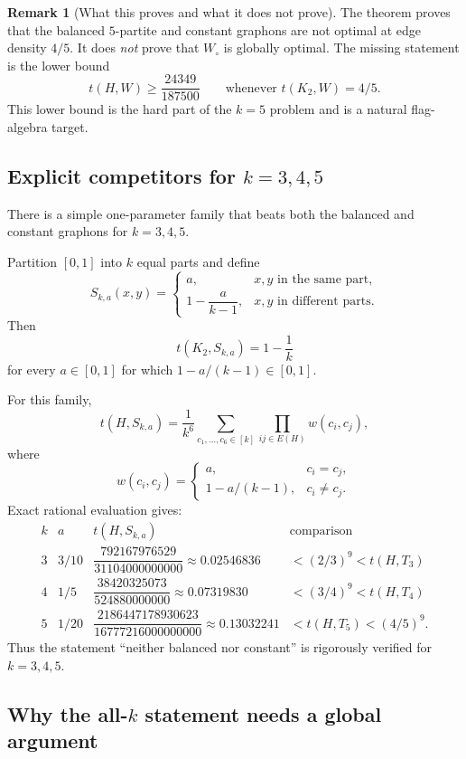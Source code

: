 \documentclass[11pt]{amsart}
\theoremstyle{definition}
\newtheorem{remark}[theorem]{Remark}
\newcommand{\1}{\mathbf 1}
\begin{document}
\begin{remark}[What this proves and what it does not prove]
The theorem proves that the balanced $5$-partite and constant graphons are not optimal at edge density $4/5$.  It does \emph{not} prove that $W_\circ$ is globally optimal.  The missing statement is the lower bound
\[
   t(H,W)\ge \frac{24349}{187500}\qquad
   \text{whenever }t(K_2,W)=4/5.
\]
This lower bound is the hard part of the $k=5$ problem and is a natural flag-algebra target.
\end{remark}

\subsection{Explicit competitors for $k=3,4,5$}

There is a simple one-parameter family that beats both the balanced and constant graphons for $k=3,4,5$.

Partition $[0,1]$ into $k$ equal parts and define
\[
   S_{k,a}(x,y)=
   \begin{cases}
      a, & x,y\text{ in the same part},\\[1mm]
      1-\dfrac{a}{k-1}, & x,y\text{ in different parts}.
   \end{cases}
\]
Then
\[
   t(K_2,S_{k,a})=1-\frac1k
\]
for every $a\in[0,1]$ for which $1-a/(k-1)\in[0,1]$.

For this family,
\[
   t(H,S_{k,a})=\frac1{k^6}\sum_{c_1,\ldots,c_6\in[k]}
        \prod_{ij\in E(H)}w(c_i,c_j),
\]
where
\[
   w(c_i,c_j)=
   \begin{cases}
      a, & c_i=c_j,\\
      1-a/(k-1), & c_i\ne c_j.
   \end{cases}
\]
Exact rational evaluation gives:
\[
\begin{array}{c|c|c|c}
 k & a & t(H,S_{k,a}) & \text{comparison}\\ \hline
 3 & 3/10 & \dfrac{792167976529}{31104000000000}\approx 0.02546836
   & <(2/3)^9<t(H,T_3)\\[2mm]
 4 & 1/5 & \dfrac{38420325073}{524880000000}\approx 0.07319830
   & <(3/4)^9<t(H,T_4)\\[2mm]
 5 & 1/20 & \dfrac{2186447178930623}{16777216000000000}\approx 0.13032241
   & <t(H,T_5)<(4/5)^9.
\end{array}
\]
Thus the statement ``neither balanced nor constant'' is rigorously verified for $k=3,4,5$.

\subsection{Why the all-$k$ statement needs a global argument}
\end{document}
